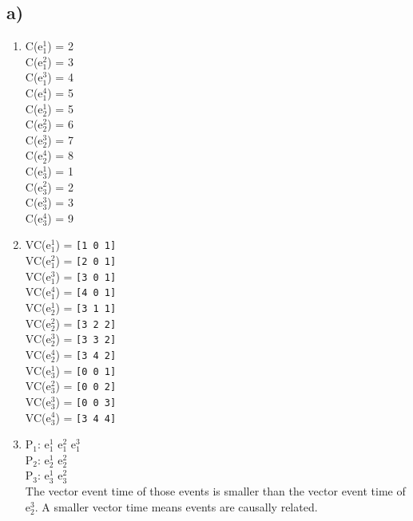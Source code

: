 \documentclass{scrartcl}
\begin{document}
\subsection*{a)}
\begin{enumerate}[label=(\roman*)]
	\item 
	C(e$^1_1$) = 2\\
	C(e$^2_1$) = 3\\
	C(e$^3_1$) = 4\\
	C(e$^4_1$) = 5\\

	C(e$^1_2$) = 5\\
	C(e$^2_2$) = 6\\
	C(e$^3_2$) = 7\\
	C(e$^4_2$) = 8\\

	C(e$^1_3$) = 1\\
	C(e$^2_3$) = 2\\
	C(e$^3_3$) = 3\\
	C(e$^4_3$) = 9\\
	\item 
	VC(e$^1_1$) = \texttt{[1 0 1]}\\
	VC(e$^2_1$) = \texttt{[2 0 1]}\\
	VC(e$^3_1$) = \texttt{[3 0 1]}\\
	VC(e$^4_1$) = \texttt{[4 0 1]}\\

	VC(e$^1_2$) = \texttt{[3 1 1]}\\
	VC(e$^2_2$) = \texttt{[3 2 2]}\\
	VC(e$^3_2$) = \texttt{[3 3 2]}\\
	VC(e$^4_2$) = \texttt{[3 4 2]}\\

	VC(e$^1_3$) = \texttt{[0 0 1]}\\
	VC(e$^2_3$) = \texttt{[0 0 2]}\\
	VC(e$^3_3$) = \texttt{[0 0 3]}\\
	VC(e$^4_3$) = \texttt{[3 4 4]}\\
	\item
	P$_1$: e$^1_1$ e$^2_1$ e$^3_1$\\
	P$_2$: e$^1_2$ e$^2_2$\\
	P$_3$: e$^1_3$ e$^2_3$\\
	The vector event time of those events is smaller than the vector event time of e$^3_2$. A smaller vector time means events are causally related.
\end{enumerate}
\end{document}
